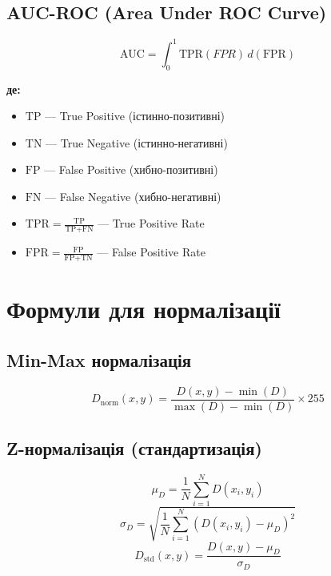 \documentclass[14pt, a4paper]{extarticle}
\numberwithin{equation}{section}
\begin{document}
\subsection{AUC-ROC (Area Under ROC Curve)}
\begin{equation}
\boxed{\text{AUC} = \int_0^1 \text{TPR}(FPR) \, d(\text{FPR})} \tag{74}
\end{equation}

\textbf{де:}
\begin{itemize}
\item $\text{TP}$ — True Positive (істинно-позитивні)
\item $\text{TN}$ — True Negative (істинно-негативні)
\item $\text{FP}$ — False Positive (хибно-позитивні)
\item $\text{FN}$ — False Negative (хибно-негативні)
\item $\text{TPR} = \frac{\text{TP}}{\text{TP} + \text{FN}}$ — True Positive Rate
\item $\text{FPR} = \frac{\text{FP}}{\text{FP} + \text{TN}}$ — False Positive Rate
\end{itemize}

\newpage

\section{Формули для нормалізації}

\subsection{Min-Max нормалізація}
\begin{equation}
\boxed{D_{\text{norm}}(x,y) = \frac{D(x,y) - \min(D)}{\max(D) - \min(D)} \times 255} \tag{75}
\end{equation}

\subsection{Z-нормалізація (стандартизація)}
\begin{equation}
\boxed{\mu_D = \frac{1}{N} \sum_{i=1}^N D(x_i,y_i)} \tag{76}
\end{equation}
\begin{equation}
\boxed{\sigma_D = \sqrt{\frac{1}{N} \sum_{i=1}^N (D(x_i,y_i) - \mu_D)^2}} \tag{77}
\end{equation}
\begin{equation}
\boxed{D_{\text{std}}(x,y) = \frac{D(x,y) - \mu_D}{\sigma_D}} \tag{78}
\end{equation}
\end{document}
